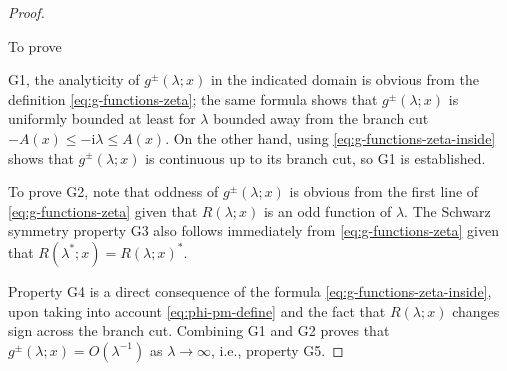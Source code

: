 \documentclass[12pt]{amsart}
\numberwithin{equation}{section}
\newcommand{\ii}{\mathrm{i}}
\newcommand{\SP}{\lambda}
\begin{document}
\begin{proof}
\hypertarget{proof-g-prop}{To prove} G1, the analyticity of $g^\pm(\SP;x)$ in the indicated domain is obvious from the definition \eqref{eq:g-functions-zeta}; the same formula shows that $g^\pm(\SP;x)$ is uniformly bounded at least for $\SP$ bounded away from the branch cut $-A(x)\le -\ii\SP\le A(x)$.  On the other hand, using \eqref{eq:g-functions-zeta-inside} shows that $g^\pm(\SP;x)$ is continuous up to its branch cut, so G1 is established.  

To prove G2, note that oddness of $g^\pm(\SP;x)$ is obvious from the first line of \eqref{eq:g-functions-zeta} given that $R(\SP;x)$ is an odd function of $\SP$.  The Schwarz symmetry property G3 also follows immediately from \eqref{eq:g-functions-zeta} given that $R(\SP^*;x)=R(\SP;x)^*$.

Property G4 is a direct consequence of the formula \eqref{eq:g-functions-zeta-inside}, upon taking into account \eqref{eq:phi-pm-define} and
the fact that $R(\SP;x)$ changes sign across the branch cut.  Combining G1 and G2 proves that $g^\pm(\SP;x)=O(\SP^{-1})$ as $\SP\to\infty$, i.e., property G5.  


\end{proof}
\end{document}
